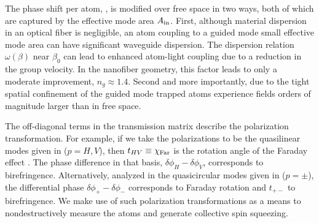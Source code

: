 \documentclass[preprint,aps,pra,onecolumn]{revtex4-1} %
\newcommand{\vac}{{\rm vac}}
\newcommand{\comment}[1]{{\color{Maroon} #1}}
\begin{document}
The phase shift per atom, , is modified over free space in two ways, both of which are captured by the effective mode area $A_{\rm in}$. First, although material dispersion in an optical fiber is negligible, an atom coupling to a guided mode small effective mode area can have significant waveguide dispersion.  The dispersion relation $\omega(\beta)$ near $\beta_0$ can lead to enhanced atom-light coupling due to a reduction in the group velocity. In the nanofiber geometry, this factor leads to only a moderate improvement, \comment{ $n_g \approx 1.4$.} Second and more importantly, due to the tight spatial confinement of the guided mode trapped atoms experience fields orders of magnitude larger than in free space. 

The off-diagonal terms in the transmission matrix describe the polarization transformation. For example, if we take the polarizations to be the quasilinear modes given in  ($p = H,V$), then $t_{HV} \equiv \chi_{\rm Far}$ is the rotation angle of the Faraday effect \cite{}.  The phase difference in that basis, $\delta  \phi_H - \delta \phi_V$, corresponds to birefringence.  Alternatively, analyzed in the quasicircular modes given in  ($p=\pm$), the differential phase $\delta \phi_+ -\delta  \phi_-$ corresponds to Faraday rotation and $t_{+-}$ to birefringence.  We make use of such polarization transformations as a means to nondestructively measure the atoms and generate collective spin squeezing.
\end{document}

